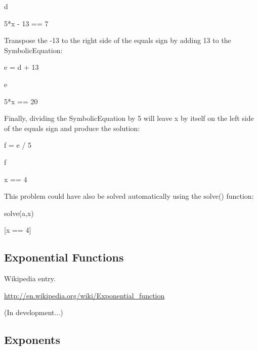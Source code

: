 \documentclass[12pt,twoside]{book}
\begin{document}
d

{\textbar}

5*x {}- 13 == 7


\bigskip

{\textquotedbl}{\textquotedbl}{\textquotedbl}

Transpose the {}-13 to the right side of the equals sign by adding 13 to the SymbolicEquation:

{\textquotedbl}{\textquotedbl}{\textquotedbl}

e = d + 13

e

{\textbar}

5*x == 20


\bigskip

{\textquotedbl}{\textquotedbl}{\textquotedbl}

Finally, dividing the SymbolicEquation by 5 will leave x by itself on the left side of the equals sign and produce the solution:

{\textquotedbl}{\textquotedbl}{\textquotedbl}

f = e / 5

f

{\textbar}

x == 4


\bigskip

{\textquotedbl}{\textquotedbl}{\textquotedbl}

This problem could have also be solved automatically using the solve() function:

{\textquotedbl}{\textquotedbl}{\textquotedbl}

solve(a,x)

{\textbar}

[x == 4]


\bigskip


\bigskip

\subsection[Exponential Functions]{Exponential Functions}

Wikipedia entry.

\href{http://en.wikipedia.org/wiki/Exponential_function}{http://en.wikipedia.org/wiki/Exponential\_function}

(In development...)

\subsection[Exponents]{Exponents}
\end{document}
